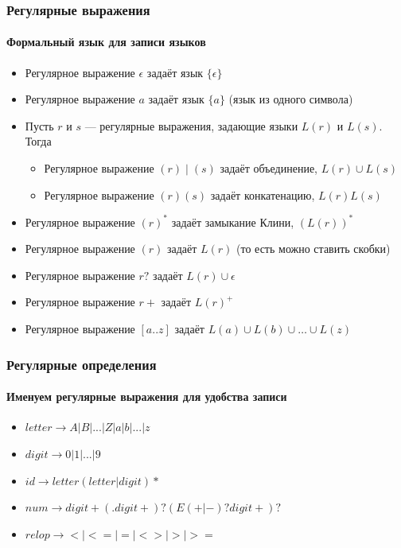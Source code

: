 \documentclass[xetex,mathserif,serif]{beamer}
\begin{document}
    \begin{frame}
        \frametitle{Регулярные выражения}
        \framesubtitle{Формальный язык для записи языков}
        \begin{itemize}
            \item Регулярное выражение $\epsilon$ задаёт язык $\{\epsilon\}$
            \item Регулярное выражение $a$ задаёт язык $\{a\}$ (язык из одного символа)
            \item Пусть $r$ и $s$ --- регулярные выражения, задающие языки $L(r)$ и $L(s)$. Тогда
            \begin{itemize}
                \item Регулярное выражение $(r) \mid (s)$ задаёт объединение, $L(r) \cup L(s)$
                \item Регулярное выражение $(r)(s)$ задаёт конкатенацию, $L(r)L(s)$
            \end{itemize}
            \item Регулярное выражение $(r)^*$ задаёт замыкание Клини, $(L(r))^*$
            \item Регулярное выражение $(r)$ задаёт $L(r)$ (то есть можно ставить скобки)
            \item Регулярное выражение $r?$ задаёт $L(r) \cup \epsilon$
            \item Регулярное выражение $r+$ задаёт $L(r)^+$
            \item Регулярное выражение $[a..z]$ задаёт $L(a) \cup L(b) \cup \ldots \cup L(z)$
        \end{itemize}
    \end{frame}

    \begin{frame}
        \frametitle{Регулярные определения}
        \framesubtitle{Именуем регулярные выражения для удобства записи}
        \begin{itemize}
            \item $letter \rightarrow A | B | ... | Z | a | b | ... | z$
            \item $digit \rightarrow 0 | 1 | ... | 9$
            \item $id \rightarrow letter (letter | digit)*$
            \item $num \rightarrow digit+ (. digit+)? (E(+ | -)? digit+)?$
            \item $relop \rightarrow < | <= | = | <> | > | >=$
        \end{itemize}
    \end{frame}
\end{document}
